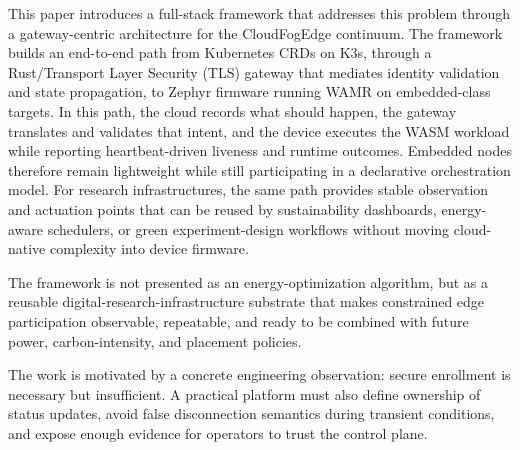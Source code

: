 This paper introduces a full-stack framework that addresses this problem through a gateway-centric architecture for the Cloud\textendash{}Fog\textendash{}Edge continuum. The framework builds an end-to-end path from Kubernetes CRDs on K3s, through a Rust/Transport Layer Security (TLS) gateway that mediates identity validation and state propagation, to Zephyr firmware running WAMR on embedded-class targets. In this path, the cloud records what should happen, the gateway translates and validates that intent, and the device executes the WASM workload while reporting heartbeat-driven liveness and runtime outcomes. Embedded nodes therefore remain lightweight while still participating in a declarative orchestration model. For research infrastructures, the same path provides stable observation and actuation points that can be reused by sustainability dashboards, energy-aware schedulers, or green experiment-design workflows without moving cloud-native complexity into device firmware.

{\color{red}
The framework is not presented as an energy-optimization algorithm, but as a reusable digital-research-infrastructure substrate that makes constrained edge participation observable, repeatable, and ready to be combined with future power, carbon-intensity, and placement policies.}

The work is motivated by a concrete engineering observation: secure enrollment is necessary but insufficient. A practical platform must also define ownership of status updates, avoid false disconnection semantics during transient conditions, and expose enough evidence for operators to trust the control plane. %

